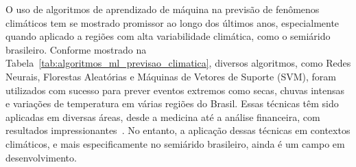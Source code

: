 \documentclass{projetodepesquisa} %
\begin{document}
	O uso de algoritmos de aprendizado de máquina na previsão de fenômenos climáticos tem se mostrado promissor ao longo dos últimos anos, especialmente quando aplicado a regiões com alta variabilidade climática, como o semiárido brasileiro. Conforme mostrado na Tabela~\ref{tab:algoritmos_ml_previsao_climatica}, diversos algoritmos, como Redes Neurais, Florestas Aleatórias e Máquinas de Vetores de Suporte (SVM), foram utilizados com sucesso para prever eventos extremos como secas, chuvas intensas e variações de temperatura em várias regiões do Brasil. Essas técnicas têm sido aplicadas em diversas áreas, desde a medicina até a análise financeira, com resultados impressionantes~\cite{ribeiro2017}. No entanto, a aplicação dessas técnicas em contextos climáticos, e mais especificamente no semiárido brasileiro, ainda é um campo em desenvolvimento.
	
\end{document}
